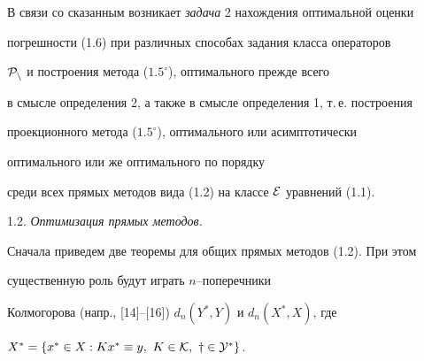 В связи со сказанным возникает {\it задача} 2 нахождения оптимальной оценки


погрешности (1.6) при различных способах задания класса операторов


$\cal P_n$ и построения метода ($1.5^\circ$), оптимального прежде всего


в смысле определения 2, а также в смысле определения 1, т.\,е. построения


проекционного метода ($1.5^\circ$), оптимального или асимптотически


оптимального или же оптимального по порядку


среди всех прямых методов вида (1.2) на классе $\cal E$ уравнений (1.1).


\medskip





1.2. {\it Оптимизация прямых методов.}


Сначала приведем две теоремы для общих прямых методов (1.2). При этом


существенную роль будут играть $n$--поперечники


Колмогорова (напр., [14]--[16]) $d_n(Y^*, Y)$ и $d_n(X^*, X)$, где


$ X^* = \{ x^* \in X : Kx^* \equiv y,\ K \in \cal K,\ y \in Y^*\}$.





